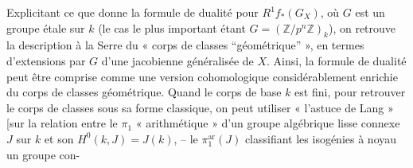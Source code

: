 \documentclass[11pt,a4paper]{article}
\begin{document}
Explicitant ce que donne la formule de dualité pour $R^1f_*(G_X)$, où $G$ est un groupe étale sur $k$ (le cas le plus important étant $G = (\mathbb{Z}/p^n\mathbb{Z})_k$), on retrouve la description à la Serre du « corps de classes “géométrique” », en termes d'extensions par $G$ d'une jacobienne généralisée de $X$. Ainsi, la formule de dualité peut être comprise comme une version cohomologique considérablement enrichie du corps de classes géométrique. Quand le corps de base $k$ est fini, pour retrouver le corps de classes sous sa forme classique, on peut utiliser « l'astuce de Lang » [sur la relation entre le $\pi_1$ « arithmétique » d'un groupe algébrique lisse connexe $J$ sur $k$ et son $H^0(k, J) = J(k)$, -- le $\pi_1^{\mathrm{ar}}(J)$ classifiant les isogénies à noyau un groupe con-
\end{document}

